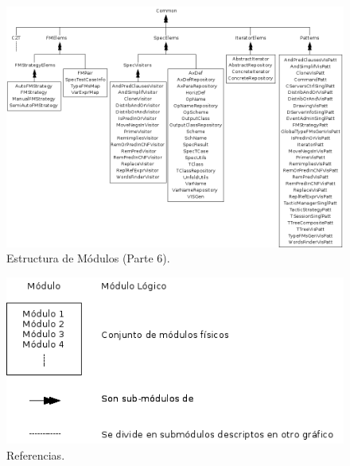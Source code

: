 \documentclass[a4paper,11pt]{article}
\begin{document}
\begin{figure}
\begin{center}
\includegraphics[scale=0.6]{./EstrucModulos06.png}
\end{center}
\caption{Estructura de Módulos (Parte 6).}
\end{figure}


\begin{figure}
\begin{center}
\includegraphics[scale=0.6]{./EstrucModulos00.png}
\end{center}
\caption{Referencias.}
\end{figure}
\end{document}
